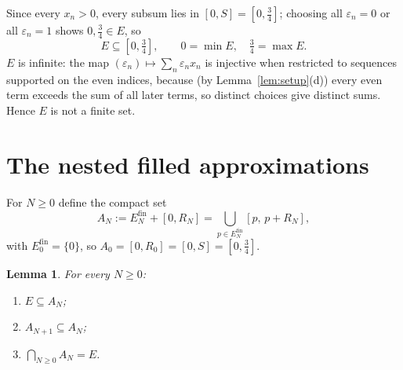 \documentclass{amsart}
\newtheorem{lemma}{Lemma}
\theoremstyle{definition}
\begin{document}
Since every $x_n>0$, every subsum lies in $[0,S]=[0,\tfrac34]$; choosing all $\varepsilon_n=0$ or
all $\varepsilon_n=1$ shows $0,\tfrac34\in E$, so
\begin{equation}\label{eq:Ebox}
  E\subseteq[0,\tfrac34],\qquad 0=\min E,\quad \tfrac34=\max E .
\end{equation}
$E$ is infinite: the map $(\varepsilon_n)\mapsto\sum_n\varepsilon_nx_n$ is injective when restricted
to sequences supported on the even indices, because (by Lemma~\ref{lem:setup}(d)) every even term
exceeds the sum of all later terms, so distinct choices give distinct sums. Hence $E$ is not a
finite set.

\section{The nested filled approximations}\label{sec:nest}

For $N\ge0$ define the compact set
\[
  A_N:=E_N^{\mathrm{fin}}+[0,R_N]=\bigcup_{p\in E_N^{\mathrm{fin}}}[p,\,p+R_N],
\]
with $E_0^{\mathrm{fin}}=\{0\}$, so $A_0=[0,R_0]=[0,S]=[0,\tfrac34]$.

\begin{lemma}\label{lem:nest}
For every $N\ge0$:
\begin{enumerate}
\item[(a)] $E\subseteq A_N$;
\item[(b)] $A_{N+1}\subseteq A_N$;
\item[(c)] $\bigcap_{N\ge0}A_N=E$.
\end{enumerate}
\end{lemma}
\end{document}
